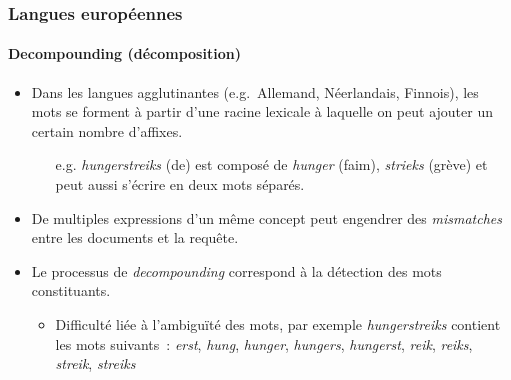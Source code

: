 \documentclass[12pt,aspectratio=43,dvipsnames,table]{beamer}
\begin{document}
\begin{frame}
    \frametitle{Langues européennes}
    \framesubtitle{Decompounding (décomposition)}
    \begin{itemize} \itemsep10pt
        \item Dans les langues agglutinantes (e.g.~Allemand, Néerlandais, 
              Finnois), les mots se forment à partir d'une racine lexicale à 
              laquelle on peut ajouter un certain nombre d'affixes.
        \begin{itemize}
            \item[e.g.] \textit{hungerstreiks} (de) est composé de 
                  \textit{hunger} (faim), \textit{strieks} (grève) et peut aussi
                  s'écrire en deux mots séparés.
        \end{itemize}
        \item De multiples expressions d'un même concept peut engendrer des 
              \textit{mismatches} entre les documents et la requête.
        \item Le processus de \textit{decompounding} correspond à la détection 
              des mots constituants.
        \begin{itemize}
            \item Difficulté liée à l'ambiguïté des mots, par exemple 
                  \textit{hungerstreiks} contient les mots suivants~: 
                  \textit{erst}, \textit{hung}, \textit{hunger}, 
                  \textit{hungers}, \textit{hungerst}, \textit{reik}, 
                  \textit{reiks}, \textit{streik}, \textit{streiks}
        \end{itemize} 
    \end{itemize}
\end{frame}
\end{document}
